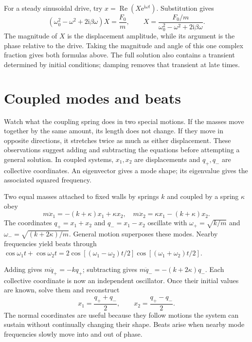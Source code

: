 \documentclass[11pt,oneside]{book}
\newcommand{\ii}{\mathrm{i}}
\newcommand{\ee}{\mathrm{e}}
\theoremstyle{reviewstyle}
\begin{document}
For a steady sinusoidal drive, try $x=\operatorname{Re}(X\ee^{\ii\omega t})$. Substitution gives
\begin{equation}
(\omega_0^2-\omega^2+2\ii\beta\omega)X=\frac{F_0}{m},
\qquad X=\frac{F_0/m}{\omega_0^2-\omega^2+2\ii\beta\omega}.
\end{equation}
The magnitude of $X$ is the displacement amplitude, while its argument is the phase relative to the drive. Taking the magnitude and angle of this one complex fraction gives both formulas above. The full solution also contains a transient determined by initial conditions; damping removes that transient at late times.

\section{Coupled modes and beats}
Watch what the coupling spring does in two special motions. If the masses move together by the same amount, its length does not change. If they move in opposite directions, it stretches twice as much as either displacement. These observations suggest adding and subtracting the equations before attempting a general solution. In coupled systems, $x_1,x_2$ are displacements and $q_+,q_-$ are collective coordinates. An eigenvector gives a mode shape; its eigenvalue gives the associated squared frequency.

Two equal masses attached to fixed walls by springs $k$ and coupled by a spring $\kappa$ obey
\begin{equation}
m\ddot x_1=-(k+\kappa)x_1+\kappa x_2,\quad
m\ddot x_2=\kappa x_1-(k+\kappa)x_2.
\end{equation}
The coordinates $q_+=x_1+x_2$ and $q_-=x_1-x_2$ oscillate with
$\omega_+=\sqrt{k/m}$ and $\omega_-=\sqrt{(k+2\kappa)/m}$. General motion superposes these modes. Nearby frequencies yield beats through
$\cos\omega_1t+\cos\omega_2t=2\cos[(\omega_1-\omega_2)t/2]\cos[(\omega_1+\omega_2)t/2]$.

Adding gives $m\ddot q_+=-kq_+$; subtracting gives $m\ddot q_-=-(k+2\kappa)q_-$. Each collective coordinate is now an independent oscillator. Once their initial values are known, solve them and reconstruct
\begin{equation}
x_1=\frac{q_++q_-}{2},\qquad x_2=\frac{q_+-q_-}{2}.
\end{equation}
The normal coordinates are useful because they follow motions the system can sustain without continually changing their shape. Beats arise when nearby mode frequencies slowly move into and out of phase.
\end{document}
